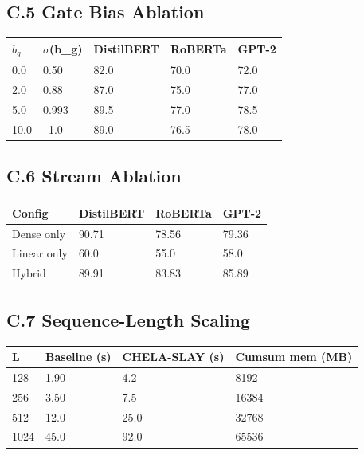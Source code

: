 \subsection{C.5 Gate Bias Ablation}

\begin{table}[H]
\centering
\small
\begin{tabular}{lllll}
\toprule
\textbf{$b_g$} & \textbf{$\sigma$(b\_g)} & \textbf{DistilBERT} & \textbf{RoBERTa} & \textbf{GPT-2} \\
\midrule
0.0 & 0.50 & 82.0 & 70.0 & 72.0 \\
2.0 & 0.88 & 87.0 & 75.0 & 77.0 \\
5.0 & 0.993 & 89.5 & 77.0 & 78.5 \\
10.0 & ~1.0 & 89.0 & 76.5 & 78.0 \\
\bottomrule
\end{tabular}
\end{table}

\subsection{C.6 Stream Ablation}

\begin{table}[H]
\centering
\small
\begin{tabular}{llll}
\toprule
\textbf{Config} & \textbf{DistilBERT} & \textbf{RoBERTa} & \textbf{GPT-2} \\
\midrule
Dense only & 90.71 & 78.56 & 79.36 \\
Linear only & 60.0 & 55.0 & 58.0 \\
Hybrid & 89.91 & 83.83 & 85.89 \\
\bottomrule
\end{tabular}
\end{table}

\subsection{C.7 Sequence-Length Scaling}

\begin{table}[H]
\centering
\small
\begin{tabular}{llll}
\toprule
\textbf{L} & \textbf{Baseline (s)} & \textbf{CHELA-SLAY (s)} & \textbf{Cumsum mem (MB)} \\
\midrule
128 & 1.90 & 4.2 & 8192 \\
256 & 3.50 & 7.5 & 16384 \\
512 & 12.0 & 25.0 & 32768 \\
1024 & 45.0 & 92.0 & 65536 \\
\bottomrule
\end{tabular}
\end{table}

